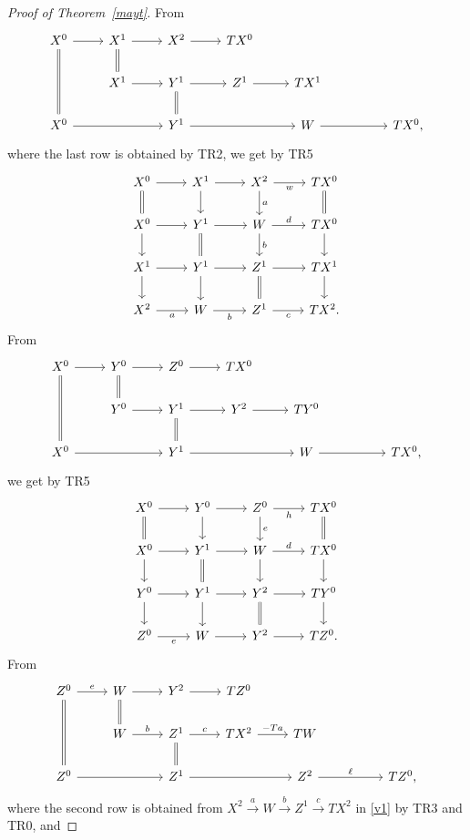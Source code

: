 \documentclass[12pt]{article}
\theoremstyle{remark}
\theoremstyle{definition}
\newcommand{\xr}{\xrightarrow}
\begin{document}
\begin{proof}[Proof of Theorem~\ref{mayt}]
From 
$$
\begin{tikzcd}
X^0\ar[equal]{dd}\ar{r}&X^1\ar[equal]{d}\ar{r}&X^2\ar{r}&TX^0\\
&X^1\ar{r}&Y^1\ar[equal]{d}\ar{r}&Z^1\ar{r}&TX^1\\
X^0\ar{rr}&&Y^1\ar{rr}&&W\ar{rr}&&TX^0,
\end{tikzcd}
$$
where the last row is obtained by TR2, we get by TR5
\begin{equation}\label{v1}
\begin{tikzcd}
X^0\ar{r}\ar[equal]{d}&X^1\ar{d}\ar{r}&X^2\ar{d}{a}\ar{r}[swap]{w}&TX^0\ar[equal]{d}\\
X^0\ar{d}\ar{r}&Y^1\ar{r}\ar[equal]{d}&W\ar{d}{b}\ar{r}{d}&TX^0\ar{d}\\
X^1\ar{d}\ar{r}&Y^1\ar{d}\ar{r}&Z^1\ar{r}\ar[equal]{d}&TX^1\ar{d}\\
X^2\ar{r}[swap]{a}&W\ar{r}[swap]{b}&Z^1\ar{r}[swap]{c}&TX^2.
\end{tikzcd}
\end{equation}
%
From 
$$
\begin{tikzcd}
X^0\ar[equal]{dd}\ar{r}&Y^0\ar[equal]{d}\ar{r}&Z^0\ar{r}&TX^0\\
&Y^0\ar{r}&Y^1\ar[equal]{d}\ar{r}&Y^2\ar{r}&TY^0\\
X^0\ar{rr}&&Y^1\ar{rr}&&W\ar{rr}&&TX^0,
\end{tikzcd}
$$
we get by TR5
\begin{equation}\label{v2}
\begin{tikzcd}
X^0\ar{r}\ar[equal]{d}&Y^0\ar{d}\ar{r}&Z^0\ar{d}{e}\ar{r}[swap]{h}&TX^0\ar[equal]{d}\\
X^0\ar{d}\ar{r}&Y^1\ar{r}\ar[equal]{d}&W\ar{d}\ar{r}{d}&TX^0\ar{d}\\
Y^0\ar{d}\ar{r}&Y^1\ar{d}\ar{r}&Y^2\ar{r}\ar[equal]{d}&TY^0\ar{d}\\
Z^0\ar{r}[swap]{e}&W\ar{r}&Y^2\ar{r}&TZ^0.
\end{tikzcd}
\end{equation}
%
From 
$$
\begin{tikzcd}
Z^0\ar[equal]{dd}\ar{r}{e}&W\ar[equal]{d}\ar{r}&Y^2\ar{r}&TZ^0\\
&W\ar{r}{b}&Z^1\ar[equal]{d}\ar{r}{c}&TX^2\ar{r}{-Ta}&TW\\
Z^0\ar{rr}&&Z^1\ar{rr}&&Z^2\ar{rr}{\ell}&&TZ^0,
\end{tikzcd}
$$
where the second row is obtained from $X^2\xr aW\xr bZ^1\xr cTX^2$ in \eqref{v1} by TR3 and TR0, and 

\end{proof}
\end{document}
